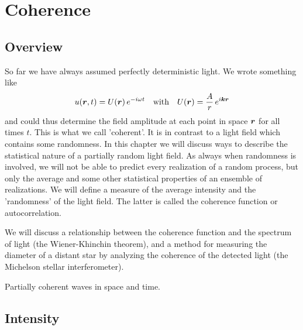 \renewcommand{\lastmod}{January 12, 2023}
\renewcommand{\chapterauthors}{Markus Lippitz}

\chapter{Coherence}




\section{Overview}

So far we have always assumed perfectly deterministic light. We wrote something like
\begin{equation}
    u(\boldsymbol{r}, t) = U(\boldsymbol{r}) \, e^{-i \omega t} \quad \text{with} \quad U(\boldsymbol{r}) = \frac{A}{r} \, e^{i \boldsymbol{k} \boldsymbol{r}}
\end{equation}
and could thus determine the field amplitude at each point in space $\boldsymbol{r}$ for all times $t$. This is what we call 'coherent'. It is in contrast to a light field which contains some randomness. In this chapter we will discuss ways to describe the statistical nature of a partially random light field. As always when randomness is involved, we will not be able to predict every realization of a random process, but only the average and some other statistical properties of an ensemble of realizations. We will define a measure of the average intensity and the 'randomness' of the light field. The latter is called the coherence function or autocorrelation.

We will discuss a relationship between the coherence function and the spectrum of light (the Wiener-Khinchin theorem), and a method for measuring the diameter of a distant star by analyzing the coherence of the detected light (the Michelson stellar interferometer).

\begin{marginfigure}


    \caption{Partially coherent waves in space and time.}
\end{marginfigure}
\section{Intensity}

